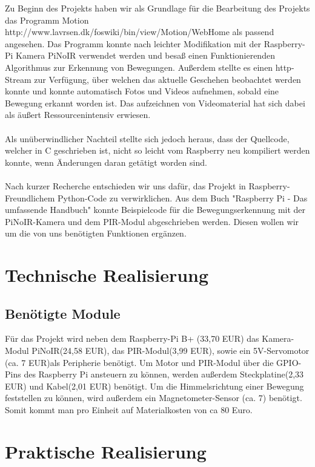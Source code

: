 \documentclass[12pt,a4paper]{scrreprt}
\begin{document}
Zu Beginn des Projekts haben wir als Grundlage für die Bearbeitung des Projekts das Programm Motion http://www.lavrsen.dk/foswiki/bin/view/Motion/WebHome als passend angesehen. Das Programm konnte nach leichter Modifikation mit der Raspberry-Pi Kamera PiNoIR verwendet werden und besaß einen Funktionierenden Algorithmus zur Erkennung von Bewegungen. Außerdem stellte es einen http-Stream zur Verfügung, über welchen das aktuelle Geschehen beobachtet werden konnte und konnte automatisch Fotos und Videos aufnehmen, sobald eine Bewegung erkannt worden ist. Das aufzeichnen von Videomaterial hat sich dabei als äußert Ressourcenintensiv erwiesen.
\\ \\
Als unüberwindlicher Nachteil stellte sich jedoch heraus, dass der Quellcode, welcher in C geschrieben ist, nicht so leicht vom Raspberry neu kompiliert werden konnte, wenn Änderungen daran getätigt worden sind.
\\ \\
Nach kurzer Recherche entschieden wir uns dafür, das Projekt in Raspberry-Freundlichem Python-Code zu verwirklichen.
Aus dem Buch "Raspberry Pi - Das umfassende Handbuch" konnte Beispielcode für die Bewegungserkennung mit der PiNoIR-Kamera und dem PIR-Modul abgeschrieben werden.
Diesen wollen wir um die von uns benötigten Funktionen ergänzen.

\chapter{Technische Realisierung}
\section{Benötigte Module}
Für das Projekt wird neben dem Raspberry-Pi B+ (33,70 EUR) das Kamera-Modul PiNoIR(24,58 EUR), das PIR-Modul(3,99 EUR), sowie ein 5V-Servomotor (ca. 7 EUR)als Peripherie benötigt. Um Motor und PIR-Modul über die GPIO-Pins des Raspberry Pi ansteuern zu können, werden außerdem Steckplatine(2,33 EUR) und Kabel(2,01 EUR) benötigt. Um die Himmelsrichtung einer Bewegung feststellen zu können, wird außerdem ein Magnetometer-Sensor (ca. 7) benötigt.
Somit kommt man pro Einheit auf Materialkosten von ca 80 Euro.


\chapter{Praktische Realisierung}
\end{document}
